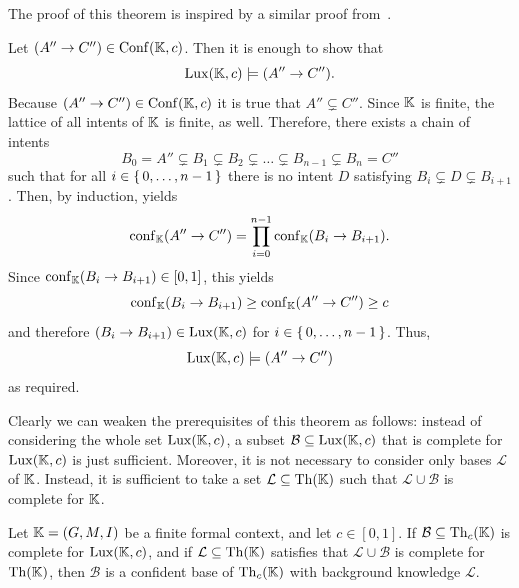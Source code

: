 The proof of this theorem is inspired by a similar proof
from~\cite{DBLP:conf/ki/StummeTBPL01}.

\begin{Proof}
  Let $(A'' \to C'') \in \operatorname{Conf}({\mathbb{K}}, c)$.  Then it is enough to show that
  \begin{equation*}
    \operatorname{Lux}({\mathbb{K}}, c) \models (A'' \to C'').
  \end{equation*}
  Because $(A'' \to C'') \in \operatorname{Conf}({\mathbb{K}}, c)$ it is true that $A'' \subsetneq C''$.
  Since ${\mathbb{K}}$ is finite, the lattice of all intents of ${\mathbb{K}}$ is finite, as well.
  Therefore, there exists a chain of intents
  \begin{equation*}
    B_0 = A'' \subsetneq B_1 \subsetneq B_2 \subsetneq \dots \subsetneq B_{n-1} \subsetneq B_n = C''
  \end{equation*}
  such that for all $i \in {\ensuremath{\{\, 0, \dots, n-1 \,\}}}$ there is no intent $D$ satisfying $B_i
  \subsetneq D \subsetneq B_{i+1}$.  Then, by induction,
   yields
  \begin{equation*}
    \operatorname{conf}_{{\mathbb{K}}}(A'' \to C'') = \prod_{i = 0}^{n-1} \operatorname{conf}_{{\mathbb{K}}}(B_i \to B_{i+1}).
  \end{equation*}
  Since $\operatorname{conf}_{{\mathbb{K}}}(B_i \to B_{i+1}) \in [0,1]$, this yields
  \begin{equation*}
    \operatorname{conf}_{{\mathbb{K}}}(B_i \to B_{i+1}) \ge \operatorname{conf}_{{\mathbb{K}}}(A'' \to C'') \ge c
  \end{equation*}
  and therefore $(B_i \to B_{i+1}) \in \operatorname{Lux}({\mathbb{K}}, c)$ for $i \in {\ensuremath{\{\,0, \dots, n-1\,\}}}$.  Thus,
  \begin{equation*}
    \operatorname{Lux}({\mathbb{K}}, c) \models (A'' \to C'')
  \end{equation*}
  as required.
\end{Proof}

Clearly we can weaken the prerequisites of this theorem as follows: instead of considering
the whole set $\operatorname{Lux}({\mathbb{K}}, c)$, a subset $\mathcal{B} \subseteq \operatorname{Lux}({\mathbb{K}}, c)$ that is
complete for $\operatorname{Lux}({\mathbb{K}}, c)$ is just sufficient.  Moreover, it is not necessary to
consider only bases $\mathcal{L}$ of ${\mathbb{K}}$.  Instead, it is sufficient to take a set
$\mathcal{L} \subseteq \operatorname{Th}({\mathbb{K}})$ such that $\mathcal{L} \cup \mathcal{B}$ is complete
for ${\mathbb{K}}$.

\begin{Corollary}
  \label{cor:weakened-luxenburger-base}
  Let ${\mathbb{K}} = (G, M, I)$ be a finite formal context, and let $c \in [0,1]$.  If
  $\mathcal{B} \subseteq \operatorname{Th}_c({\mathbb{K}})$ is complete for $\operatorname{Lux}({\mathbb{K}}, c)$, and if
  $\mathcal{L} \subseteq \operatorname{Th}({\mathbb{K}})$ satisfies that $\mathcal{L} \cup \mathcal{B}$ is
  complete for $\operatorname{Th}({\mathbb{K}})$, then $\mathcal{B}$ is a confident base of $\operatorname{Th}_c({\mathbb{K}})$
  with background knowledge $\mathcal{L}$.
\end{Corollary}

